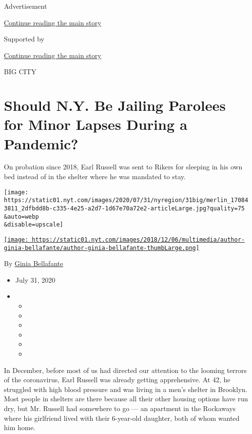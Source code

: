 Advertisement

\protect\hyperlink{after-top}{Continue reading the main story}

Supported by

\protect\hyperlink{after-sponsor}{Continue reading the main story}

BIG CITY

\hypertarget{should-ny-be-jailing-parolees-for-minor-lapses-during-a-pandemic}{%
\section{Should N.Y. Be Jailing Parolees for Minor Lapses During a
Pandemic?}\label{should-ny-be-jailing-parolees-for-minor-lapses-during-a-pandemic}}

On probation since 2018, Earl Russell was sent to Rikers for sleeping in
his own bed instead of in the shelter where he was mandated to stay.

\texttt{[image: https://static01.nyt.com/images/2020/07/31/nyregion/31big/merlin\_170843811\_2dfbdd8b-c335-4e25-a2d7-1d67e70a72e2-articleLarge.jpg?quality=75\\\&auto=webp\\\&disable=upscale]}

\href{https://www.nytimes.com/by/ginia-bellafante}{\texttt{[image: https://static01.nyt.com/images/2018/12/06/multimedia/author-ginia-bellafante/author-ginia-bellafante-thumbLarge.png]}}

By \href{https://www.nytimes.com/by/ginia-bellafante}{Ginia Bellafante}

\begin{itemize}
\item
  July 31, 2020
\item
  \begin{itemize}
  \item
  \item
  \item
  \item
  \item
  \item
  \end{itemize}
\end{itemize}

In December, before most of us had directed our attention to the looming
terrors of the coronavirus, Earl Russell was already getting
apprehensive. At 42, he struggled with high blood pressure and was
living in a men's shelter in Brooklyn. Most people in shelters are there
because all their other housing options have run dry, but Mr. Russell
had somewhere to go --- an apartment in the Rockaways where his
girlfriend lived with their 6-year-old daughter, both of whom wanted him
home.

